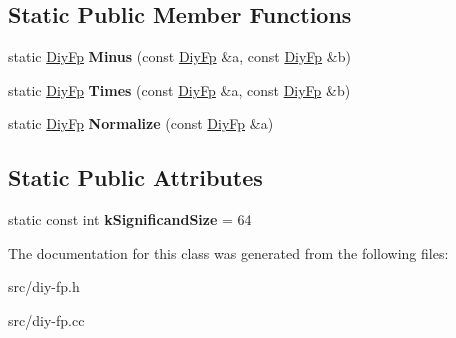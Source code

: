 \subsection*{Static Public Member Functions}
\begin{DoxyCompactItemize}
\item 
\hypertarget{classv8_1_1internal_1_1_diy_fp_a3f8e81ff6c13ae8b5935a0ec5acfcf2f}{}static \hyperlink{classv8_1_1internal_1_1_diy_fp}{Diy\+Fp} {\bfseries Minus} (const \hyperlink{classv8_1_1internal_1_1_diy_fp}{Diy\+Fp} \&a, const \hyperlink{classv8_1_1internal_1_1_diy_fp}{Diy\+Fp} \&b)\label{classv8_1_1internal_1_1_diy_fp_a3f8e81ff6c13ae8b5935a0ec5acfcf2f}

\item 
\hypertarget{classv8_1_1internal_1_1_diy_fp_a92c31f86fc66d3f38b210dd116bc444a}{}static \hyperlink{classv8_1_1internal_1_1_diy_fp}{Diy\+Fp} {\bfseries Times} (const \hyperlink{classv8_1_1internal_1_1_diy_fp}{Diy\+Fp} \&a, const \hyperlink{classv8_1_1internal_1_1_diy_fp}{Diy\+Fp} \&b)\label{classv8_1_1internal_1_1_diy_fp_a92c31f86fc66d3f38b210dd116bc444a}

\item 
\hypertarget{classv8_1_1internal_1_1_diy_fp_a379331248231f685a0c4c039f4bd4173}{}static \hyperlink{classv8_1_1internal_1_1_diy_fp}{Diy\+Fp} {\bfseries Normalize} (const \hyperlink{classv8_1_1internal_1_1_diy_fp}{Diy\+Fp} \&a)\label{classv8_1_1internal_1_1_diy_fp_a379331248231f685a0c4c039f4bd4173}

\end{DoxyCompactItemize}
\subsection*{Static Public Attributes}
\begin{DoxyCompactItemize}
\item 
\hypertarget{classv8_1_1internal_1_1_diy_fp_a751e7d05584e45570106af4828453393}{}static const int {\bfseries k\+Significand\+Size} = 64\label{classv8_1_1internal_1_1_diy_fp_a751e7d05584e45570106af4828453393}

\end{DoxyCompactItemize}


The documentation for this class was generated from the following files\+:\begin{DoxyCompactItemize}
\item 
src/diy-\/fp.\+h\item 
src/diy-\/fp.\+cc\end{DoxyCompactItemize}
